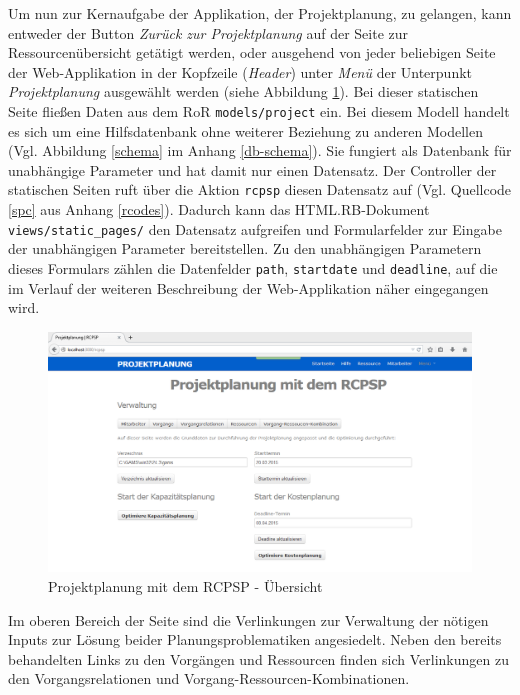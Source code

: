 \documentclass[a4paper,12pt,parskip,bibtotoc,liststotoc]{article}
\begin{document}
Um nun zur Kernaufgabe der Applikation, der Projektplanung, zu gelangen, kann entweder der Button \textit{Zurück zur Projektplanung} auf der Seite zur Ressourcenübersicht getätigt werden, oder ausgehend von jeder beliebigen Seite der Web-Applikation in der Kopfzeile (\textit{Header}) unter \textit{Menü} der Unterpunkt \textit{Projektplanung} ausgewählt werden (siehe Abbildung \ref{RCPSP}). Bei dieser statischen Seite fließen Daten aus dem RoR \texttt{models/project} ein. Bei diesem Modell handelt es sich um eine Hilfsdatenbank ohne weiterer Beziehung zu anderen Modellen (Vgl. Abbildung \ref{schema} im Anhang \ref{db-schema}). Sie fungiert als Datenbank für unabhängige Parameter und hat damit nur einen Datensatz. Der Controller der statischen Seiten ruft über die Aktion \texttt{rcpsp} diesen Datensatz auf (Vgl. Quellcode \ref{spc} aus Anhang \ref{rcodes}). Dadurch kann das HTML.RB-Dokument \texttt{views/static\_pages/} den Datensatz aufgreifen und Formularfelder zur Eingabe der unabhängigen Parameter bereitstellen. Zu den unabhängigen Parametern dieses Formulars zählen die Datenfelder \texttt{path}, \texttt{startdate} und \texttt{deadline}, auf die im Verlauf der weiteren Beschreibung der Web-Applikation näher eingegangen wird.\\ %


\begin{figure}[h!]
  \begin{center}
    \includegraphics[width=120mm]{Bilder/Projektplanung.png}
    \caption{Projektplanung mit dem RCPSP - Übersicht}  \label{RCPSP}
  \end{center}
\end{figure}

Im oberen Bereich der Seite sind die Verlinkungen zur Verwaltung der nötigen Inputs zur Lösung beider Planungsproblematiken angesiedelt. Neben den bereits behandelten Links zu den Vorgängen und Ressourcen finden sich Verlinkungen zu den Vorgangsrelationen und Vorgang-Ressourcen-Kombinationen.\\ 
\end{document}
